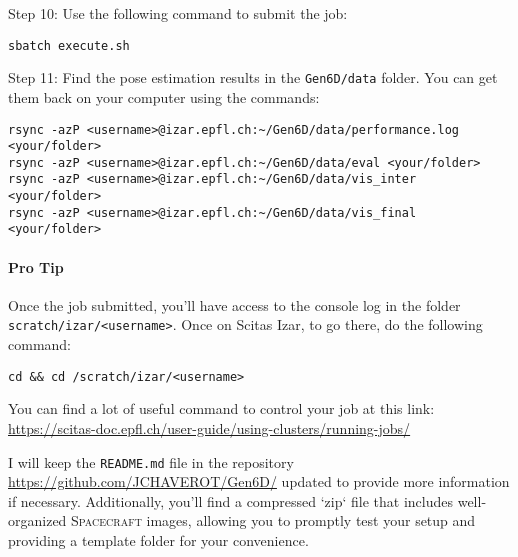 \bigskip


\noindent Step 10: Use the following command to submit the job:
{ \captionsetup{labelformat=empty,labelsep=none}
\begin{lstlisting}[style=bashstyle, caption=\null]
sbatch execute.sh
\end{lstlisting}
}

\vspace{-0.4cm}

\noindent Step 11: Find the pose estimation results in the \texttt{Gen6D/data} folder. You can get them back on your computer using the commands:
{ \captionsetup{labelformat=empty,labelsep=none}
\begin{lstlisting}[style=bashstyle, caption=\null, keywordstyle=\color{black}]
rsync -azP <username>@izar.epfl.ch:~/Gen6D/data/performance.log <your/folder>
rsync -azP <username>@izar.epfl.ch:~/Gen6D/data/eval <your/folder>
rsync -azP <username>@izar.epfl.ch:~/Gen6D/data/vis_inter <your/folder>
rsync -azP <username>@izar.epfl.ch:~/Gen6D/data/vis_final <your/folder>
\end{lstlisting}
}

\vspace{-0.4cm}

\paragraph{Pro Tip} Once the job submitted, you'll have access to the console log in the folder \texttt{scratch/izar/<username>}. Once on Scitas Izar, to go there, do the following command:
{ \captionsetup{labelformat=empty,labelsep=none}
\begin{lstlisting}[style=bashstyle, caption=\null]
cd && cd /scratch/izar/<username>
\end{lstlisting}
}

\bigskip

\noindent You can find a lot of useful command to control your job at this link: \url{https://scitas-doc.epfl.ch/user-guide/using-clusters/running-jobs/}

\bigskip

\noindent I will keep the \texttt{README.md} file in the repository \url{https://github.com/JCHAVEROT/Gen6D/} updated to provide more information if necessary. Additionally, you'll find a compressed `zip` file that includes well-organized \textsc{Spacecraft} images, allowing you to promptly test your setup and providing a template folder for your convenience.


\cleardoublepage{}